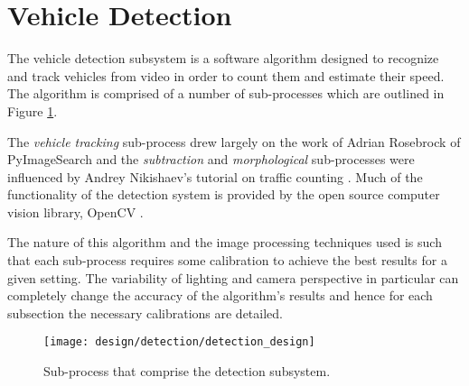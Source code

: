 \section{Vehicle Detection}

The vehicle detection subsystem is a software algorithm designed to recognize and track vehicles from video in order to count them and estimate their speed. The algorithm is comprised of a number of sub-processes which are outlined in Figure \ref{fig:detection_design}. 

The \emph{vehicle tracking} sub-process drew largely on the work of Adrian Rosebrock \cite{adrian_rosebrock_simple_object_tracking}\cite{adrian_rosebrock_vehicle_tracking} of PyImageSearch and the \emph{subtraction} and \emph{morphological} sub-processes were influenced by Andrey Nikishaev's tutorial on traffic counting \cite{andrey_nikishaev_traffic_counting}. Much of the functionality of the detection system is provided by the open source computer vision library, OpenCV \cite{opencv}.

The nature of this algorithm and the image processing techniques used is such that each sub-process requires some calibration to achieve the best results for a given setting. The variability of lighting and camera perspective in particular can completely change the accuracy of the algorithm's results and hence for each subsection the necessary calibrations are detailed.

\begin{figure}[H]
    \texttt{[image: design/detection/detection\_design]}
    \caption{Sub-process that comprise the detection subsystem.}
    \label{fig:detection_design}
\end{figure}





